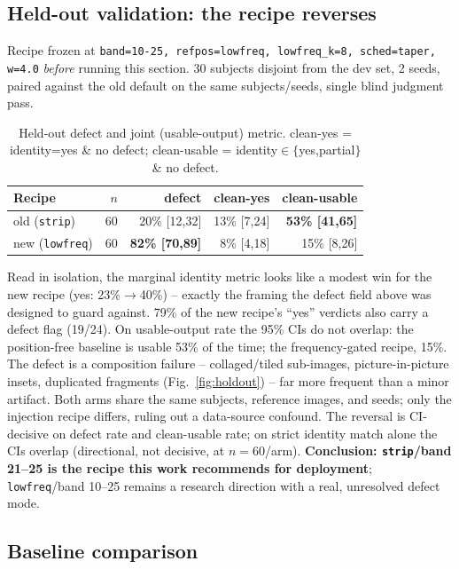 \subsection{Held-out validation: the recipe reverses}\label{sec:heldout}

Recipe frozen at \texttt{band=10-25, refpos=lowfreq, lowfreq\_k=8,
sched=taper, w=4.0} \emph{before} running this section. 30 subjects
disjoint from the dev set, 2 seeds, paired against the old default on the
same subjects/seeds, single blind judgment pass.

\begin{table}[t]
\centering\small
\begin{tabular}{@{}lrrrr@{}}
\toprule
Recipe & $n$ & defect & clean-yes & clean-usable \\
\midrule
old (\texttt{strip}) & 60 & 20\% [12,32] & 13\% [7,24] & \textbf{53\% [41,65]} \\
new (\texttt{lowfreq}) & 60 & \textbf{82\% [70,89]} & 8\% [4,18] & 15\% [8,26] \\
\bottomrule
\end{tabular}
\caption{Held-out defect and joint (usable-output) metric. clean-yes = identity=yes \& no defect; clean-usable = identity$\in\{$yes,partial$\}$ \& no defect.}
\label{tab:heldout}
\end{table}

Read in isolation, the marginal identity metric looks like a modest win
for the new recipe (yes: 23\%$\to$40\%) -- exactly the framing the
defect field above was designed to guard against. 79\% of the new
recipe's ``yes'' verdicts also carry a defect flag
(19/24). On usable-output rate the 95\% CIs do not overlap: the
position-free baseline is usable 53\% of the time; the frequency-gated
recipe, 15\%. The defect is a composition failure -- collaged/tiled
sub-images, picture-in-picture insets, duplicated fragments
(Fig.~\ref{fig:holdout}) -- far more frequent than a minor artifact. Both
arms share the same subjects, reference images, and seeds; only the
injection recipe differs, ruling out a data-source confound. The
reversal is CI-decisive on defect rate and clean-usable rate; on strict
identity match alone the CIs overlap (directional, not decisive, at
$n{=}60$/arm). \textbf{Conclusion: \texttt{strip}/band 21--25 is the
recipe this work recommends for deployment}; \texttt{lowfreq}/band
10--25 remains a research direction with a real, unresolved defect mode.

\subsection{Baseline comparison}\label{sec:baseline}

